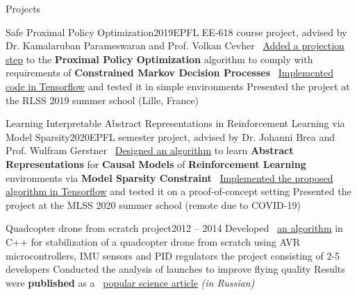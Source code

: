 \documentclass{resume} %
\newcommand{\mylink}{{\color{gray}\faExternalLink}}
\begin{document}
\begin{rSection}{Projects}
	\begin{rSubsection}{Safe Proximal Policy Optimization}{2019}{EPFL EE-618 course project, advised by Dr. Kamalaruban Parameswaran and Prof. Volkan Cevher}{}
		\myitem \mylink~\href{https://www.overleaf.com/read/cvxkswbspgpb}{Added a projection step} to the {\bf Proximal Policy Optimization} algorithm to comply with requirements of {\bf Constrained Markov Decision Processes}
		\myitem \mylink~\href{https://github.com/sergeivolodin/SafeContinuousStateRL}{Implemented code in Tensorflow} and tested it in simple environments
		\myitem Presented the project at the RLSS 2019 summer school (Lille, France)
	\end{rSubsection}
	
	\begin{rSubsection}{Learning Interpretable Abstract Representations in Reinforcement Learning via Model Sparsity}{2020}{EPFL semester project, advised by Dr. Johanni Brea and Prof. Wulfram Gerstner}{}
		\myitem \mylink~\href{https://www.overleaf.com/read/nqgjrjbcybrp}{Designed an algorithm} to learn {\bf Abstract Representations} for {\bf Causal Models} of {\bf Reinforcement Learning} environments via {\bf Model Sparsity Constraint}
		\myitem \mylink~\href{https://github.com/sergeivolodin/SafeContinuousStateRL}{Implemented the proposed algorithm in Tensorflow} and tested it on a proof-of-concept setting
		\myitem Presented the project at the MLSS 2020 summer school (remote due to COVID-19)
	\end{rSubsection}
	
	\begin{rSubsection}{Quadcopter drone from scratch project}{2012 -- 2014}{}{}
		\myitem Developed \mylink~\href{https://github.com/it-workshop/Quadrocopter}{an algorithm} in C++ for stabilization of a quadcopter drone from scratch using AVR microcontrollers, IMU sensors and PID regulators
		 the project consisting of 2-5 developers
		\myitem Conducted the analysis of launches to improve flying quality
		\myitem Results were {\bf published} as a \mylink~\href{http://web.archive.org/web/20141016114551/http://habrahabr.ru/company/technoworks/blog/216437/}{popular science article} {\em (in Russian)}
	\end{rSubsection}
\end{rSection}
\end{document}
